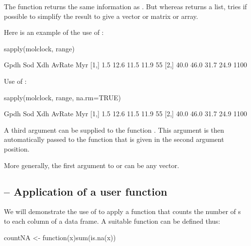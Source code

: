 The function  returns the  same
information as . But whereas  returns a
list,  tries if possible to simplify the result to give
a vector or matrix or array.

Here is an example of the use of :
\begin{Schunk}
\begin{Sinput}
sapply(molclock, range)
\end{Sinput}
\begin{Soutput}
     Gpdh  Sod  Xdh AvRate  Myr
[1,]  1.5 12.6 11.5   11.9   55
[2,] 40.0 46.0 31.7   24.9 1100
\end{Soutput}
\end{Schunk}

\begin{marginfigure}[68pt]
Use of :
\begin{Schunk}
\begin{Sinput}
sapply(molclock, range,
       na.rm=TRUE)
\end{Sinput}
\begin{Soutput}
     Gpdh  Sod  Xdh AvRate  Myr
[1,]  1.5 12.6 11.5   11.9   55
[2,] 40.0 46.0 31.7   24.9 1100
\end{Soutput}
\end{Schunk}
\end{marginfigure}
A third argument 
can be supplied to the function .  This argument is then
automatically passed to the function that is given in the second
argument position.

More generally, the first argument to  or
 can be any vector.

\subsection*{ -- Application of a user function}
We will demonstrate the use of  to apply a function
that counts the number of s to each column of a data frame.
A suitable function can be defined thus:
\begin{Schunk}
\begin{Sinput}
countNA <- function(x)sum(is.na(x))
\end{Sinput}
\end{Schunk}

